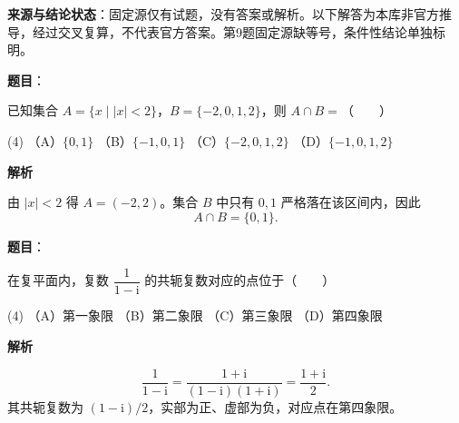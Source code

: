 

\begin{gktip}
\textbf{来源与结论状态}：固定源仅有试题，没有答案或解析。以下解答为本库非官方推导，经过交叉复算，不代表官方答案。第9题固定源缺等号，条件性结论单独标明。
\end{gktip}


\begin{answer}

\textbf{题目}：

已知集合 $A=\{x\mid |x|<2\}$，$B=\{-2,0,1,2\}$，则 $A\cap B=$\mbox{（　　）}

\begin{gkopts}(4)
\task （A）$\{0,1\}$
\task （B）$\{-1,0,1\}$
\task （C）$\{-2,0,1,2\}$
\task （D）$\{-1,0,1,2\}$
\end{gkopts}

\textbf{解析}

由 $|x|<2$ 得 $A=(-2,2)$。集合 $B$ 中只有 $0,1$ 严格落在该区间内，因此
\nopagebreak[4]
\[
A\cap B=\{0,1\}.
\]


\end{answer}
\begin{answer}

\textbf{题目}：

在复平面内，复数 $\dfrac{1}{1-\mathrm i}$ 的共轭复数对应的点位于\mbox{（　　）}

\begin{gkopts}(4)
\task （A）第一象限
\task （B）第二象限
\task （C）第三象限
\task （D）第四象限
\end{gkopts}

\textbf{解析}

\nopagebreak[4]
\[
\frac1{1-\mathrm i}=\frac{1+\mathrm i}{(1-\mathrm i)(1+\mathrm i)}=\frac{1+\mathrm i}{2}.
\]
其共轭复数为 $(1-\mathrm i)/2$，实部为正、虚部为负，对应点在第四象限。


\end{answer}
